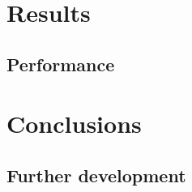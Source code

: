 \documentclass[a4paper,11pt]{kth-mag}
\begin{document}


\chapter{Results}
\section{Performance}

\chapter{Conclusions}



\section{Further development}
\appendix
\addappheadtotoc

%



\end{document}

